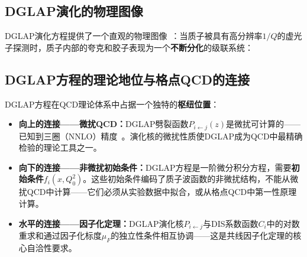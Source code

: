 \documentclass[12pt,a4paper]{ctexart}
\theoremstyle{definition}
\begin{document}
\subsection{DGLAP演化的物理图像}

DGLAP演化方程提供了一个直观的物理图像~\cite{PeskinSchroeder1995,Su2023RGR}：当质子被具有高分辨率$1/Q$的虚光子探测时，质子内部的夸克和胶子表现为一个\textbf{不断分化}的级联系统：

\begin{center}
\end{center}

\subsection{DGLAP方程的理论地位与格点QCD的连接}

DGLAP方程在QCD理论体系中占据一个独特的\textbf{枢纽位置}：

\begin{itemize}[leftmargin=*]
    \item \textbf{向上的连接——微扰QCD：}DGLAP劈裂函数$P_{i\leftarrow j}(z)$是微扰可计算的——已知到三圈（NNLO）精度~\cite{Moch2004splitting,Vogt2004splitting}。演化核的微扰性质使DGLAP成为QCD中最精确检验的理论工具之一。
    \item \textbf{向下的连接——非微扰初始条件：}DGLAP方程是一阶微分积分方程，需要\textbf{初始条件}$f_i(x, Q_0^2)$。这些初始条件编码了质子波函数的非微扰结构，不能从微扰QCD中计算——它们必须从实验数据中拟合，或从格点QCD中第一性原理计算。
    \item \textbf{水平的连接——因子化定理：}DGLAP演化核$P_{i\leftarrow j}$与DIS系数函数$C_i$中的对数重求和通过因子化标度$\mu_F$的独立性条件相互协调——这是共线因子化定理的核心自洽性要求。
\end{itemize}
\end{document}
